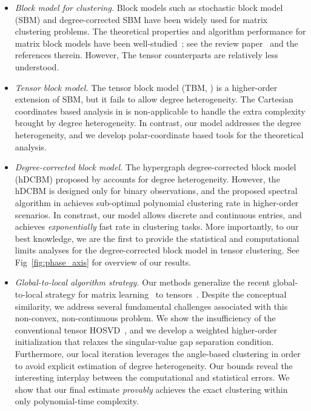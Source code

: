 \documentclass[lettersize,onecolumn,journal]{IEEEtran}
\theoremstyle{definition}
\theoremstyle{definition}
\begin{document}
\begin{itemize}
    \item \textit{Block model for clustering.} Block models such as stochastic block model (SBM) and degree-corrected SBM have been widely used for matrix clustering problems. The theoretical properties and algorithm performance for matrix block models have been well-studied~\citep{gao2018community}; see the review paper~\citep{abbe2017community} and the references therein. However, The tensor counterparts are relatively less understood. 
    
    \item  \textit{Tensor block model.} The tensor block model (TBM, \cite{wang2019multiway, han2020exact, ghoshdastidar2017consistency}) is a higher-order extension of SBM, but it fails to allow degree heterogeneity. The Cartesian coordinates based analysis in \cite{han2020exact} is non-applicable to handle the extra complexity brought by degree heterogeneity. In contrast, our model addresses the degree heterogeneity, and we develop polar-coordinate based tools for the theoretical analysis.
    
    \item \textit{Degree-corrected block model.} The hypergraph degree-corrected block model (hDCBM) proposed by \cite{ke2019community, yuan2018testing} accounts for degree heterogeneity. However, the hDCBM is designed only for binary observations, and the proposed spectral algorithm in \cite{ke2019community} achieves sub-optimal polynomial clustering rate in higher-order scenarios. In constrast, our model allows discrete and continuous entries, and achieves \emph{exponentially} fast rate in clustering tasks. More importantly, to our best knowledge, we are the first to provide the statistical and computational limits analyses for the degree-corrected block model in tensor clustering. See Fig~\ref{fig:phase_axis} for overview of our results. 
    
    \item \textit{Global-to-local algorithm strategy.} Our methods generalize the recent global-to-local strategy for matrix learning~\citep{gao2018community,chi2019nonconvex,yun2016optimal} to tensors~\citep{han2020exact,ahn2018hypergraph,kim2018stochastic}. Despite the conceptual similarity, we address several fundamental challenges associated with this non-convex, non-continuous problem. We show the insufficiency of the conventional tensor HOSVD~\citep{de2000multilinear}, and we develop a weighted higher-order initialization that relaxes the singular-value gap separation condition. Furthermore, our local iteration leverages the angle-based clustering in order to avoid explicit estimation of degree heterogeneity. Our bounds reveal the interesting interplay between the computational and statistical errors. We show that our final estimate \emph{provably} achieves the exact clustering within only polynomial-time complexity. 
    
\end{itemize}
\end{document}
